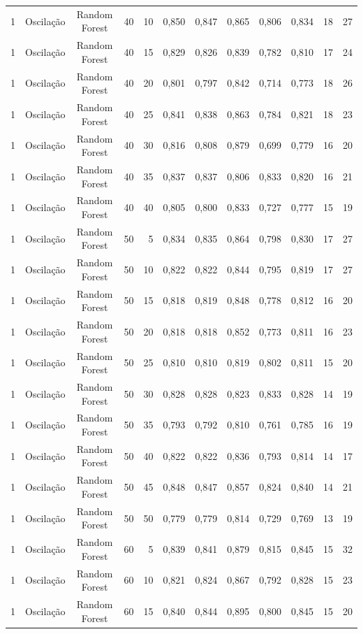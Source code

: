 \begin{longtable}{ccclrrrrrrrr}
1 & Oscilação & Random Forest & 40 & 10 & 0,850 & 0,847 & 0,865 & 0,806 & 0,834 & 18 & 27 \\
1 & Oscilação & Random Forest & 40 & 15 & 0,829 & 0,826 & 0,839 & 0,782 & 0,810 & 17 & 24 \\
1 & Oscilação & Random Forest & 40 & 20 & 0,801 & 0,797 & 0,842 & 0,714 & 0,773 & 18 & 26 \\
1 & Oscilação & Random Forest & 40 & 25 & 0,841 & 0,838 & 0,863 & 0,784 & 0,821 & 18 & 23 \\
1 & Oscilação & Random Forest & 40 & 30 & 0,816 & 0,808 & 0,879 & 0,699 & 0,779 & 16 & 20 \\
1 & Oscilação & Random Forest & 40 & 35 & 0,837 & 0,837 & 0,806 & 0,833 & 0,820 & 16 & 21 \\
1 & Oscilação & Random Forest & 40 & 40 & 0,805 & 0,800 & 0,833 & 0,727 & 0,777 & 15 & 19 \\
1 & Oscilação & Random Forest & 50 & 5 & 0,834 & 0,835 & 0,864 & 0,798 & 0,830 & 17 & 27 \\
1 & Oscilação & Random Forest & 50 & 10 & 0,822 & 0,822 & 0,844 & 0,795 & 0,819 & 17 & 27 \\
1 & Oscilação & Random Forest & 50 & 15 & 0,818 & 0,819 & 0,848 & 0,778 & 0,812 & 16 & 20 \\
1 & Oscilação & Random Forest & 50 & 20 & 0,818 & 0,818 & 0,852 & 0,773 & 0,811 & 16 & 23 \\
1 & Oscilação & Random Forest & 50 & 25 & 0,810 & 0,810 & 0,819 & 0,802 & 0,811 & 15 & 20 \\
1 & Oscilação & Random Forest & 50 & 30 & 0,828 & 0,828 & 0,823 & 0,833 & 0,828 & 14 & 19 \\
1 & Oscilação & Random Forest & 50 & 35 & 0,793 & 0,792 & 0,810 & 0,761 & 0,785 & 16 & 19 \\
1 & Oscilação & Random Forest & 50 & 40 & 0,822 & 0,822 & 0,836 & 0,793 & 0,814 & 14 & 17 \\
1 & Oscilação & Random Forest & 50 & 45 & 0,848 & 0,847 & 0,857 & 0,824 & 0,840 & 14 & 21 \\
1 & Oscilação & Random Forest & 50 & 50 & 0,779 & 0,779 & 0,814 & 0,729 & 0,769 & 13 & 19 \\
1 & Oscilação & Random Forest & 60 & 5 & 0,839 & 0,841 & 0,879 & 0,815 & 0,845 & 15 & 32 \\
1 & Oscilação & Random Forest & 60 & 10 & 0,821 & 0,824 & 0,867 & 0,792 & 0,828 & 15 & 23 \\
1 & Oscilação & Random Forest & 60 & 15 & 0,840 & 0,844 & 0,895 & 0,800 & 0,845 & 15 & 20 \\

\end{longtable}
